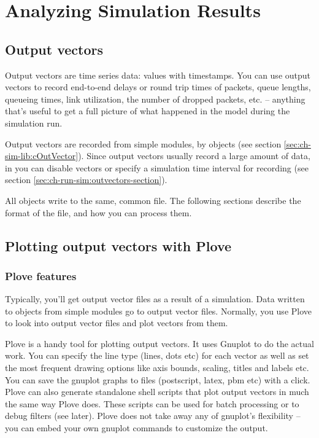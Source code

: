 \chapter{Analyzing Simulation Results}
\label{cha:analyzing-simulation-results}


\section{Output vectors}

Output vectors are time series data: values with timestamps.
You can use output vectors to record end-to-end delays or
round trip times of packets, queue lengths, queueing times,
link utilization, the number of dropped packets, etc. --
anything that's useful to get a full picture of what happened
in the model during the simulation run.

Output vectors are recorded from simple modules, by  objects
(see section \ref{sec:ch-sim-lib:cOutVector}). Since output vectors usually
record a large amount of data, in  you can disable vectors
or specify a simulation time interval for recording
(see section \ref{sec:ch-run-sim:outvectors-section}).

All  objects write to the same, common file.
The following sections describe the format of the file, and
how you can process them.


\section{Plotting output vectors with Plove}

\subsection{Plove features}

Typically, you'll get output vector files as a result of a simulation.
Data written to  objects from
simple modules go to output vector
files. Normally, you use Plove to look
into output vector files and plot vectors from them.

Plove is a handy tool for plotting {\opp} output vectors.
It uses Gnuplot to do the actual work. You can specify
the line type (lines, dots etc) for each vector as well as set the
most frequent drawing options like axis bounds, scaling, titles and
labels etc. You can save the gnuplot graphs to files (postscript,
latex, pbm etc) with a click. Plove can also generate standalone shell
scripts that plot output vectors in much the same way Plove does. 
These scripts can be used for batch processing or to debug
filters (see later). Plove does not take away any of gnuplot's
flexibility -- you can embed your own gnuplot commands to customize
the output.



